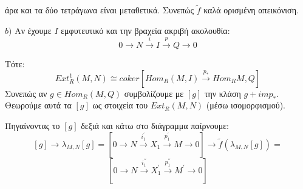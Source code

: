 \documentclass{article}
\begin{document}
\begin{enumerate}
			\begin{center}
			\end{center}

			άρα και τα δύο τετράγωνα είναι μεταθετικά. Συνεπώς $\widetilde{f}$ καλά ορισμένη απεικόνιση.
$ $\newline




$b)$ Αν έχουμε $I$ εμφυτευτικό και την βραχεία ακριβή ακολουθία:
$$0 \rightarrow N \xrightarrow{i} I \xrightarrow{p} Q \rightarrow 0$$

Τότε:
$$Ext_{R}^1 (M,N) \cong coker[Hom_R (M,I) \xrightarrow{p_*} Hom_R {M,Q}] $$
Συνεπώς αν $g \in Hom_R (M,Q)$ συμβολίζουμε με $[g]$ την κλάση  $g + imp_* $. Θεωρούμε αυτά τα $[g]$ ως στοιχεία του $Ext_R (M,N)$ (μέσω ισομορφισμού).

Πηγαίνοντας το $[g]$ δεξιά και κάτω στο διάγραμμα παίρνουμε:
$$[g] \rightarrow \lambda_{M,N} [g] = [0 \rightarrow N \xrightarrow{i^{\prime}_1 }  X_1 \xrightarrow{p^{\prime}_1} M \rightarrow 0 ] \rightarrow \widetilde{f}(\lambda_{M,N} [g] ) = $$
$$[0 \rightarrow N \xrightarrow{i^{\prime \prime}_1 }   X^{\prime}_1   \xrightarrow{p^{\prime \prime }_1 } M^{\prime} \rightarrow 0 ]  $$


\end{enumerate}
\end{document}
